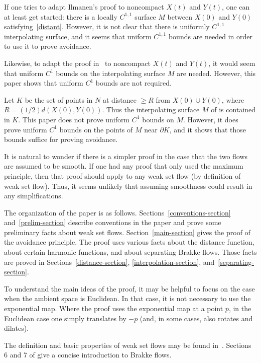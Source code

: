 \documentclass{amsart}
\theoremstyle{definition}
\theoremstyle{definition}
\begin{document}
If one tries to adapt Ilmanen's proof  to noncompact $X(t)$ and $Y(t)$, one can at least get started:
there is a locally $C^{1,1}$ surface $M$ between $X(0)$ and $Y(0)$ satisfying~\eqref{distant}. 
 However, it is not clear that there is 
 uniformly $C^{1,1}$ interpolating surface, and it seems that uniform $C^{1,1}$ bounds
are needed in order to use it to prove avoidance.  

Likewise, to adapt the proof in~\cite{hershkovits-w-avoid} to noncompact $X(t)$ and $Y(t)$, 
it would seem that uniform $C^1$ bounds on the interpolating surface $M$ are needed.
However, this paper shows that uniform $C^1$ bounds are not required.

Let $K$ be the set of points in $N$ at distance $\ge R$ from $X(0)\cup Y(0)$, where 
$R= (1/2)d(X(0),Y(0))$.  Thus the interpolating surface $M$ of \cite{hershkovits-w-avoid}
 is contained in $K$.   This paper does not prove uniform $C^1$ bounds on $M$.
 However, it does prove uniform $C^1$ bounds on the  points of $M$ near $\partial K$,
 and it shows that those bounds suffice for  proving avoidance.
 
It is natural to wonder if there is a simpler proof in the case that the two flows are assumed to be
smooth.  If one had any proof that only used the maximum principle, then 
 that proof should apply to any weak set flow (by definition of weak set flow). Thus, it seems  
   unlikely that assuming smoothness could result in any simplifications.

The organization of the paper is as follows.  Sections~\ref{conventions-section}
 and~\ref{prelim-section} describe conventions in the paper and 
prove some preliminary facts about weak set flows.
Section~\ref{main-section} gives the proof of the avoidance principle.
The proof uses various facts about the distance function, about certain harmonic
functions, and about separating Brakke flows.  
Those facts are proved in Sections~\ref{distance-section}, \ref{interpolation-section},
and~\ref{separating-section}.

To understand the main ideas of the proof, it  may be helpful to focus
on the case when the ambient space is Euclidean.  In that case, it is not necessary to use the exponential map.  Where the proof uses the exponential map
at a point $p$, in the Euclidean case one simply translates by $-p$ (and, in some cases, also rotates
and dilates).

The definition and basic properties of weak set flows may be found in~\cite{hershkovits-w-avoid}.
Sections 6 and 7 of \cite{ilmanen-elliptic} give a concise introduction to Brakke flows.
\end{document}
